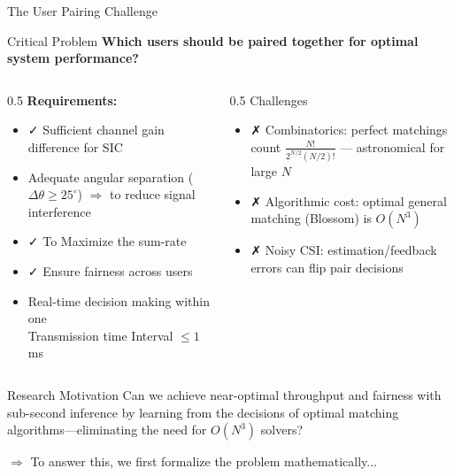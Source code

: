 \documentclass[aspectratio=169]{beamer}
\begin{document}
\begin{frame}{The User Pairing Challenge}
    \begin{block}{Critical Problem}
        \textbf{Which users should be paired together for optimal system performance?}
    \end{block}
    
    \vspace{0.3cm}
    
    \begin{columns}
        \begin{column}{0.5\textwidth}
            \textbf{Requirements:}
            \begin{itemize}
                \item ✓ Sufficient channel gain difference for SIC
                \item Adequate angular separation ($\Delta\theta \geq 25^\circ$) $\Rightarrow$ to reduce signal interference
                \item ✓ To Maximize the sum-rate
                \item ✓ Ensure fairness across users
                \item Real-time decision making within one \\ Transmission time Interval $\leq 1$ ms
            \end{itemize}
        \end{column}
        \begin{column}{0.5\textwidth}
            Challenges
      \begin{itemize}
        \item ✗ Combinatorics: perfect matchings count 
              $\displaystyle \frac{N!}{2^{N/2}(N/2)!}$ — astronomical for large $N$
        \item ✗ Algorithmic cost: optimal general matching (Blossom) is $O(N^3)$
        \item ✗ Noisy CSI: estimation/feedback errors can flip pair decisions
      \end{itemize}
    \end{column}
    \end{columns}
    
   
    
    \begin{alertblock}{Research Motivation}
    Can we achieve near-optimal throughput and fairness with sub-second inference by learning from the decisions of optimal matching algorithms—eliminating the need for $O(N^3)$ solvers?
    \end{alertblock}
    
    \vspace{0.2cm}
    \small \textcolor{iiitblue}{$\Rightarrow$ To answer this, we first formalize the problem mathematically...}
\end{frame}
\end{document}
